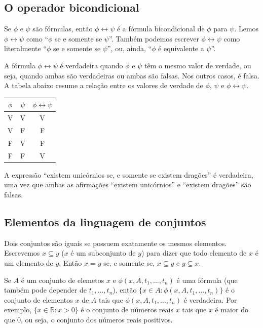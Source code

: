 \subsection{O operador bicondicional}
Se $\phi$ e $\psi$ são fórmulas, então $\phi\leftrightarrow \psi$ é a fórmula bicondicional de $\phi$ para $\psi$.
Lemos $\phi\leftrightarrow \psi$ como ``$\phi$ se e somente se $\psi$''.
Também podemos escrever $\phi\leftrightarrow \psi$ como literalmente ``$\phi$ se e somente se $\psi$'', ou, ainda, ``$\phi$ é equivalente a $\psi$''.

A fórmula $\phi\leftrightarrow \psi$ é verdadeira quando $\phi$ e $\psi$ têm o mesmo valor de verdade, ou seja, quando ambas são verdadeiras ou ambas são falsas.
Nos outros casos, é falsa.
A tabela abaixo resume a relação entre os valores de verdade de $\phi$, $\psi$ e $\phi\leftrightarrow \psi$.

\begin{center}
    \begin{tabular}{cc|c}
        $\phi$ & $\psi$ & $\phi\leftrightarrow \psi$ \\
        \hline
        V & V & V \\
        V & F & F \\
        F & V & F \\
        F & F & V
    \end{tabular}
\end{center}
\begin{example}
    A expressão ``existem unicórnios se, e somente se existem dragões'' é verdadeira, uma vez que ambas as afirmações ``existem unicórnios'' e ``existem dragões'' são falsas.
\end{example}

\subsection{Elementos da linguagem de conjuntos}
Dois conjuntos são iguais se possuem exatamente os mesmos elementos.
Escrevemos $x\subseteq y$ ($x$ é um subconjunto de $y$) para dizer que todo elemento de $x$ é um elemento de $y$.
Então $x=y$ se, e somente se, $x\subseteq y$ e $y\subseteq x$.

Se $A$ é um conjunto de elemetos $x$ e $\phi(x, A, t_1, \dots, t_n)$ é uma fórmula (que também pode depender de $t_1, \dots, t_n$), então $\{x\in A: \phi(x, A, t_1, \dots, t_n)\}$ é o conjunto de elementos $x$ de $A$ tais que $\phi(x, A, t_1, \dots, t_n)$ é verdadeira.
Por exemplo, $\{x\in \mathbb R: x>0\}$ é o conjunto de números reais $x$ tais que $x$ é maior do que $0$, ou seja, o conjunto dos números reais positivos.

